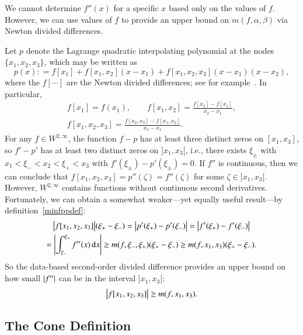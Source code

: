 \documentclass[review]{elsarticle}
\theoremstyle{definition}
\renewcommand{\cw}{W}
\begin{document}
We cannot determine $f''(x)$ for a specific $x$ based only on the values of $f$.
However, we can use values of $f$ to provide an upper bound on $m(f,\alpha,
\beta)$ via Newton divided differences.

Let $p$ denote the Lagrange quadratic interpolating polynomial at the nodes
$\{x_1, x_2, x_3\}$, which may be written as
\begin{equation*}
p(x) : = f[x_1] + f[x_1, x_2](x-x_1) + f[x_1, x_2, x_3](x-x_1)(x-x_2),
\end{equation*}
where the $f[\cdots]$ are the Newton divided differences; see for
example~\cite{CheKin12a}. In particular,
\begin{gather}
\nonumber
f[x_1] = f(x_1), \qquad f[x_1, x_2] = \frac{f[x_2] - f[x_1]}{x_2-x_1},  \\
f[x_1, x_2,x_3] = \frac{f[x_2,x_3] - f[x_1,x_2]}{x_3-x_1}. \label{divdiff}
\end{gather}
For any $f \in \cw^{2,\infty}$, the function $f - p$ has at least three distinct
zeros on $[x_1, x_3]$, so $f' - p'$ has at least two distinct zeros on $]x_1,
x_3[$, i.e., there exists $\xi_\pm$ with $x_1 < \xi_- < x_2 < \xi_+ < x_3$ with
$f'(\xi_\pm) - p'(\xi_{\pm}) = 0$. If $f''$ is continuous, then we can conclude
that $ f[x_1, x_2, x_3]= p''(\zeta) =f''(\zeta) $ for some $\zeta \in ]x_1,
x_3[$. However, $\cw^{2,\infty}$ contains functions without continuous second
derivatives. Fortunately, we can obtain a somewhat weaker---yet equally useful
result---by definition~\eqref{minfppdef}:
\begin{multline*}
\bigl \lvert f[x_1, x_2, x_3] \bigr \rvert(\xi_+  - \xi_-) = \left \lvert p'(\xi_+) - p'(\xi_-) \right \rvert =  \left \lvert f'(\xi_+) - f'(\xi_-) \right \rvert \\
= \left \lvert \int_{\xi_-}^{\xi_+} f''(x) \, {\rm d} x \right \rvert \ge m(f,\xi_-, \xi_+) (\xi_+  - \xi_-)  \ge m(f,x_1, x_3) (\xi_+  - \xi_-) .
\end{multline*}
So the data-based second-order divided difference provides an upper bound on how
small $\left \lvert f'' \right \rvert$ can be in the interval $]x_1, x_3[$:
\begin{equation} \label{NDDbdm}
\bigl \lvert f[x_1, x_2, x_3] \bigr \rvert \ge m(f,x_1, x_3).
\end{equation}

\subsection{The Cone Definition}  \label{sec:conedef}
\end{document}
